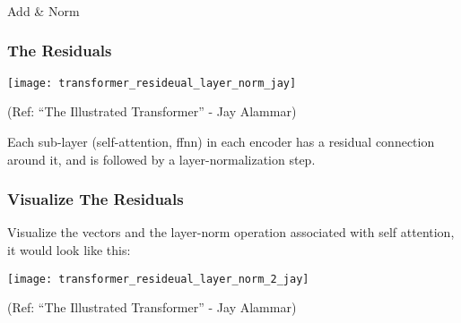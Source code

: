 			



			
			
		


\begin{frame}[fragile]\frametitle{}
\begin{center}
{\Large Add \& Norm}
\end{center}
\end{frame}

\begin{frame}[fragile]\frametitle{The Residuals}


\begin{center}
\texttt{[image: transformer\_resideual\_layer\_norm\_jay]}


{\tiny (Ref: ``The Illustrated Transformer'' - Jay Alammar)}
\end{center}		

Each sub-layer (self-attention, ffnn) in each encoder has a residual connection around it, and is followed by a layer-normalization step.


\end{frame}

\begin{frame}[fragile]\frametitle{Visualize The Residuals}

Visualize the vectors and the layer-norm operation associated with self attention, it would look like this:

\begin{center}
\texttt{[image: transformer\_resideual\_layer\_norm\_2\_jay]}


{\tiny (Ref: ``The Illustrated Transformer'' - Jay Alammar)}
\end{center}		

\end{frame}

